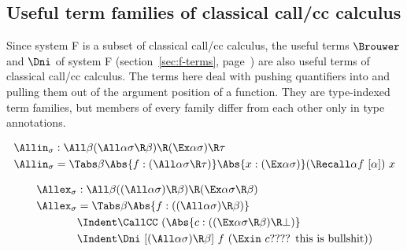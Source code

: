 \documentclass{amsart}
\begin{document}
\nc{}

\nc{}

\nc{}

\FRules

\ExistentialIntroduction

\ExistentialElimination

\DoubleNegationElimination

\NukeRule

\subsection{Useful term families of classical  call/cc calculus}

Since system F is a subset of classical call/cc calculus, the
useful terms $\Brouwer$ and $\Dni$ of system F
(section~\ref{sec:f-terms}, page~\pageref{sec:f-terms}) are also
useful terms of classical call/cc calculus. The terms here deal
with pushing quantifiers into and pulling them out of the
argument position of a function. They are type-indexed term
families, but members of every family differ from each other only
in type annotations.

\begin{align*}
\Allin_\sigma & : \All\beta
  (\All\alpha \sigma\R\beta) \R
  (\Ex\alpha \sigma) \R \tau
  \\
\Allin_\sigma & = \Tabs\beta
  \Abs{f : (\All\alpha \sigma \R \tau)}
  \Abs{x : (\Ex\alpha \sigma)}
  (\Recall\alpha f~[\alpha])~x
\end{align*}

\begin{align*}
\Allex_\sigma & : \All\beta
  ((\All\alpha\sigma) \R \beta) \R
  (\Ex\alpha \sigma \R \beta)
  \\
\Allex_\sigma & = \Tabs\beta
  \Abs{f : ((\All\alpha\sigma) \R \beta)}
  \\ &\Indent
  \CallCC~(\Abs{c : ((\Ex\alpha \sigma \R \beta) \R \bot)}
  \\ &\Indent
  \Dni~[(\All\alpha\sigma) \R \beta]~f~(
    \Exin~c
\mbox{???? this is bullshit}
  ))
\end{align*}
\end{document}

